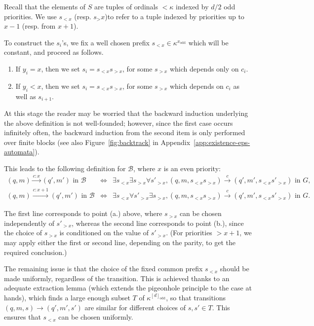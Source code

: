 \documentclass[a4paper,UKenglish,cleveref, thm-restate]{lipics-v2021}
\newcommand{\re}[1]{\xrightarrow{#1}}
\newcommand{\tin}{\text{ in }}
\newcommand{\odd}{\mathrm{odd}}
\newcommand{\B}{\mathcal B}
\renewcommand{\d}{[d]}
\begin{document}
Recall that the elements of $S$ are tuples of ordinals $<\kappa$ indexed by $d/2$ odd priorities. We use $s_{<x}$ (resp. $s_>x$)to refer to a tuple indexed by priorities up to $x-1$ (resp. from $x+1$).


To construct the $s_i$'s, we fix a well chosen prefix $s_{<x}\in \kappa^{x_\odd}$ which will be constant, and proceed as follows.

\begin{enumerate}[(a.)]
    \item If $y_i=x$, then we set $s_i=s_{<x} s_{>x}$, for some $s_{>x}$ which depends only on $c_i$.
    \item If $y_i<x$, then we set $s_i=s_{<x} s_{>x}$, for some $s_{>x}$ which depends on $c_i$ as well as $s_{i+1}$.
\end{enumerate}

At this stage the reader may be worried that the backward induction underlying the above definition is not well-founded; however, since the first case occurs infinitely often, the backward induction from the second item is only performed over finite blocks (see also Figure~\ref{fig:backtrack} in Appendix~\ref{app:existence-eps-automata}).

This leads to the following definition for $\B$, where $x$ is an even priority:
\[
    \begin{array}{rcl}
     (q,m) \re{c:x} (q',m') \tin \B  &\iff&  \exists s_{<x} \exists s_{>x} \forall s'_{>x}, (q,m,s_{<x}s_{>x}) \re{c} (q',m',s_{<x} s'_{>x}) \tin G, \\
     (q,m) \re{c:x+1} (q',m') \tin \B  &\iff&  \exists s_{<x} \forall s'_{>x} \exists s_{>x}, (q,m,s_{<x}s_{>x}) \re{c} (q',m',s_{<x} s'_{>x}) \tin G.
    \end{array}
\]

The first line corresponds to point (a.) above, where $s_{>x}$ can be chosen independently of $s'_{>x}$, whereas the second line corresponds to point (b.), since the choice of $s_{>x}$ is conditioned on the value of $s'_{>x}$.
(For priorities $>x+1$, we may apply either the first or second line, depending on the parity, to get the required conclusion.)

The remaining issue is that the choice of the fixed common prefix $s_{<x}$ should be made uniformly, regardless of the transition.
This is achieved thanks to an adequate extraction lemma (which extends the pigeonhole principle to the case at hands), which finds a large enough subset $T$ of $\kappa^{\d_\odd}$, so that transitions $(q,m,s)\re{}(q',m',s')$ are similar for different choices of $s,s' \in T$.
This ensures that $s_{<x}$ can be chosen uniformly.
\end{document}
